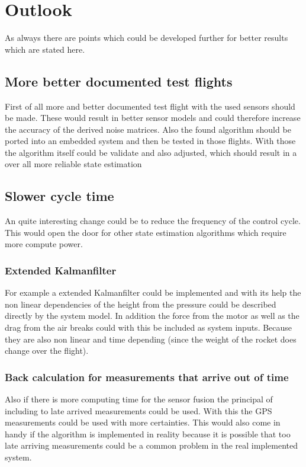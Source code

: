 \section{Outlook}
As always there are points which could be developed further for better results which are stated here.

\subsection{More better documented test flights}
First of all more and better documented test flight with the used sensors should be made.
These would result in better sensor models and could therefore increase the accuracy of the derived noise matrices.
Also the found algorithm should be ported into an embedded system and then be tested in those flights.
With those the algorithm itself could be validate and also adjusted, which should result in a over all more reliable state estimation

\subsection{Slower cycle time}
An quite interesting change could be to reduce the frequency of the control cycle.
This would open the door for other state estimation algorithms which require more compute power.

\subsubsection{Extended Kalmanfilter}
For example a extended Kalmanfilter could be implemented and with its help the non linear dependencies of the height from the pressure
could be described directly by the system model.
In addition the force from the motor as well as the drag from the air breaks could with this be included as system inputs.
Because they are also non linear and time depending (since the weight of the rocket does change over the flight).

\subsubsection{Back calculation for measurements that arrive out of time}
Also if there is more computing time for the sensor fusion the principal of including to late arrived measurements could be used.
With this the GPS measurements could be used with more certainties.
This would also come in handy if the algorithm is implemented in reality because
it is possible that too late arriving measurements could be a common problem in the real implemented system.

